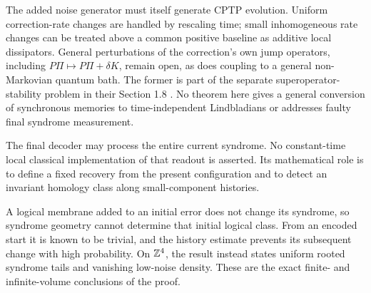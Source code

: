 The added noise generator must itself generate CPTP evolution.
Uniform correction-rate changes are handled by rescaling time;
small inhomogeneous rate changes can be treated above a common
positive baseline as additive local dissipators.
General perturbations of the correction's own jump operators,
including \(P\Pi\mapsto P\Pi+\delta K\), remain open, as does
coupling to a general non-Markovian quantum bath.
The former is part of the separate superoperator-stability problem
in their Section 1.8 \cite{DOA}.
No theorem here gives a general conversion of synchronous memories
to time-independent Lindbladians or addresses faulty final
syndrome measurement.

The final decoder may process the entire current syndrome. No
constant-time local classical implementation of that readout is
asserted. Its mathematical role is to define a fixed recovery
from the present configuration and to detect an invariant
homology class along small-component histories.

A logical membrane added to an initial error does not change
its syndrome, so syndrome geometry cannot determine that
initial logical class. From an encoded start it is known to
be trivial, and the history estimate prevents its subsequent
change with high probability. On \(\mathbb Z^4\), the result instead
states uniform rooted syndrome tails and vanishing low-noise
density. These are the exact finite- and infinite-volume
conclusions of the proof.

